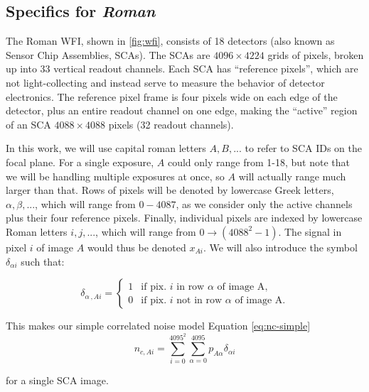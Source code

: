 \documentclass[12pt]{pasj01}
\begin{document}
\subsection{Specifics for \textit{Roman}}

The Roman WFI, shown in \ref{fig:wfi}, consists of 18 detectors (also known as Sensor Chip Assemblies, SCAs). The SCAs are $4096\times4224$ grids of pixels, broken up into 33 vertical readout channels. Each SCA has ``reference pixels'', which are not light-collecting and instead serve to measure the behavior of detector electronics. The reference pixel frame is four pixels wide on each edge of the detector, plus an entire readout channel on one edge, making the ``active'' region of an SCA $4088\times4088$ pixels (32 readout channels).

In this work, we will use capital roman letters $A, B, ...$ to refer to SCA IDs on the focal plane. For a single exposure, $A$ could only range from 1-18, but note that we will be handling multiple exposures at once, so $A$ will actually range much larger than that. Rows of pixels will be denoted by lowercase Greek letters, $\alpha, \beta,...$, which will range from $0 - 4087$, as we consider only the active channels plus their four reference pixels. Finally, individual pixels are indexed by lowercase Roman letters $i, j, ...$, which will range from $0\rightarrow (4088^2-1)$. The signal in pixel $i$ of image $A$ would thus be denoted $x_{Ai}$. We will also introduce the symbol $\delta_{\alpha i}$ such that:

\begin{equation}
\delta_{\alpha\,,Ai} = \begin{cases}
1 & \text{if pix. } i \text{ in row } \alpha \text{ of image A},\\
0  & \text{if pix. } i \text{ not in row } \alpha \text{ of image A.}
\end{cases}
\end{equation}

This makes our simple correlated noise model Equation \ref{eq:nc-simple}
\begin{equation}
    n_{c, Ai} = \sum_{i=0}^{4095^2}\sum_{\alpha=0}^{4095} p_{A\alpha}\delta_{\alpha i}
\end{equation}

for a single SCA image.
\end{document}

